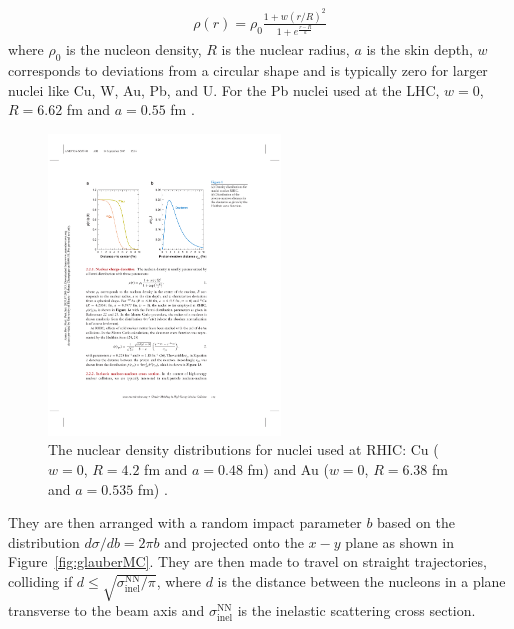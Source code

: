 \begin{align}
\rho(r) = \rho_0 \frac{1 + w (r/R)^2}{1+e^{\frac{r-R}{a}}}
\end{align}
where $\rho_0$ is the nucleon density, $R$ is the nuclear radius, $a$ is the skin depth, $w$ corresponds to deviations from a circular shape and is typically zero for larger nuclei like Cu, W, Au, Pb, and U. For the Pb nuclei used at the LHC, $w = 0$, $R = 6.62$ fm and $a =0.55$ fm \cite{DEVRIES1987495}. 

\begin{figure}[htbp]
\begin{center}
\includegraphics[width=0.55\textwidth]{figures/theory/nuclearDensity}
\caption{ The nuclear density distributions for nuclei used at RHIC: Cu ($w = 0$, $R = 4.2$ fm and $a =0.48$ fm)  and Au ($w = 0$, $R = 6.38$ fm and $a =0.535$ fm) \cite{doi:10.1146/annurev.nucl.57.090506.123020, DEVRIES1987495}.}
\label{fig:nuclearDensity}
\end{center}
\end{figure}

They are then arranged with a random impact parameter $b$ based on the distribution $d\sigma/d b = 2\pi b$ and projected onto the $x-y$ plane as shown in Figure~\ref{fig:glauberMC}. They are then made to travel on straight trajectories, colliding if $d \leq \sqrt{\sigma_{\mathrm{inel}}^{\mathrm{NN}}/ \pi}$, where $d$ is the distance between the nucleons in a plane transverse to the beam axis and $\sigma_{\mathrm{inel}}^{\mathrm{NN}}$ is the inelastic scattering cross section. \cite{doi:10.1146/annurev.nucl.57.090506.123020, Alver:2008aq}

